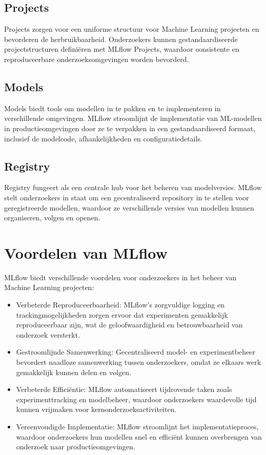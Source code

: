 \subsection{Projects}
Projects zorgen voor een uniforme structuur voor Machine Learning projecten en bevorderen de herbruikbaarheid. Onderzoekers kunnen gestandaardiseerde projectstructuren definiëren met MLflow Projects, waardoor consistente en reproduceerbare onderzoeksomgevingen worden bevorderd.

\subsection{Models}
Models biedt tools om modellen in te pakken en te implementeren in verschillende omgevingen. MLflow stroomlijnt de implementatie van ML-modellen in productieomgevingen door ze te verpakken in een gestandaardiseerd formaat, inclusief de modelcode, afhankelijkheden en configuratiedetails.

\subsection{Registry}
Registry fungeert als een centrale hub voor het beheren van modelversies. MLflow stelt onderzoekers in staat om een gecentraliseerd repository in te stellen voor geregistreerde modellen, waardoor ze verschillende versies van modellen kunnen organiseren, volgen en openen.

\section{Voordelen van MLflow}

MLflow biedt verschillende voordelen voor onderzoekers in het beheer van Machine Learning projecten:

\begin{itemize}
    \item Verbeterde Reproduceerbaarheid: MLflow's zorgvuldige logging en trackingmogelijkheden zorgen ervoor dat experimenten gemakkelijk reproduceerbaar zijn, wat de geloofwaardigheid en betrouwbaarheid van onderzoek versterkt.
    \item Gestroomlijnde Samenwerking: Gecentraliseerd model- en experimentbeheer bevordert naadloze samenwerking tussen onderzoekers, omdat ze elkaars werk gemakkelijk kunnen delen en volgen.
    \item Verbeterde Efficiëntie: MLflow automatiseert tijdrovende taken zoals experimenttracking en modelbeheer, waardoor onderzoekers waardevolle tijd kunnen vrijmaken voor kernonderzoeksactiviteiten.
    \item Vereenvoudigde Implementatie: MLflow stroomlijnt het implementatieproces, waardoor onderzoekers hun modellen snel en efficiënt kunnen overbrengen van onderzoek naar productieomgevingen.
\end{itemize}

